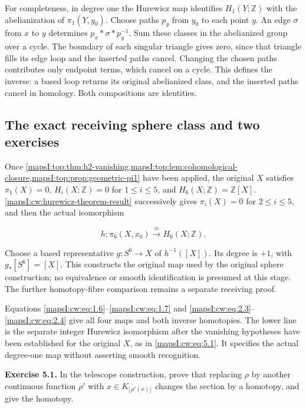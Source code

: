 \documentclass[11pt]{article}
\begin{document}
For completeness, in degree one the Hurewicz map identifies \(H_1(Y;\mathbb Z)\) with the abelianization of \(\pi_1(Y,y_0)\). Choose paths \(p_y\) from \(y_0\) to each point \(y\). An edge \(\sigma\) from \(x\) to \(y\) determines \(p_x*\sigma*p_y^{-1}\). Sum these classes in the abelianized group over a cycle. The boundary of each singular triangle gives zero, since that triangle fills its edge loop and the inserted paths cancel. Changing the chosen paths contributes only endpoint terms, which cancel on a cycle. This defines the inverse: a based loop returns its original abelianized class, and the inserted paths cancel in homology. Both compositions are identities.

\subsection{The exact receiving sphere class and two exercises}
\label{mapsI:cw:cw-hurewicz-exercises}

Once \cref{mapsI:top:thm:h2-vanishing,mapsI:top:lem:cohomological-closure,mapsI:top:prop:geometric-pi1} have been applied, the original \(X\) satisfies
\(\pi_1(X)=0\), \(H_i(X;\mathbb Z)=0\) for \(1\leq i\leq5\), and
\(H_6(X;\mathbb Z)=\mathbb Z[X]\).
\cref{mapsI:cw:hurewicz-theorem-result} successively gives \(\pi_i(X)=0\) for \(2\leq i\leq5\), and then the actual isomorphism

\begin{equation}
h:\pi_6(X,x_0)\xrightarrow{\;\cong\;}H_6(X;\mathbb Z).
\label{mapsI:cw:eq:5.1}
\end{equation}

Choose a based representative \(g:S^6\to X\) of \(h^{-1}([X])\). Its degree is \(+1\), with
\(g_*[S^6]=[X]\). This constructs the original map used by the original sphere construction; no equivalence or smooth identification is presumed at this stage. The further homotopy-fibre comparison remains a separate receiving proof.

Equations \eqref{mapsI:cw:eq:1.6}--\eqref{mapsI:cw:eq:1.7} and \eqref{mapsI:cw:eq:2.3}--\eqref{mapsI:cw:eq:2.4} give all four maps and both inverse homotopies. The lower line is the separate integer Hurewicz isomorphism after the vanishing hypotheses have been established for the original \(X\), as in \eqref{mapsI:cw:eq:5.1}. It specifies the actual degree-one map without asserting smooth recognition.

\textbf{Exercise 5.1.}\label{mapsI:cw:exercise:5.1} In the telescope construction, prove that replacing \(\rho\) by another continuous function \(\rho'\) with \(x\in K_{\lfloor\rho'(x)\rfloor}\) changes the section by a homotopy, and give the homotopy.
\end{document}
